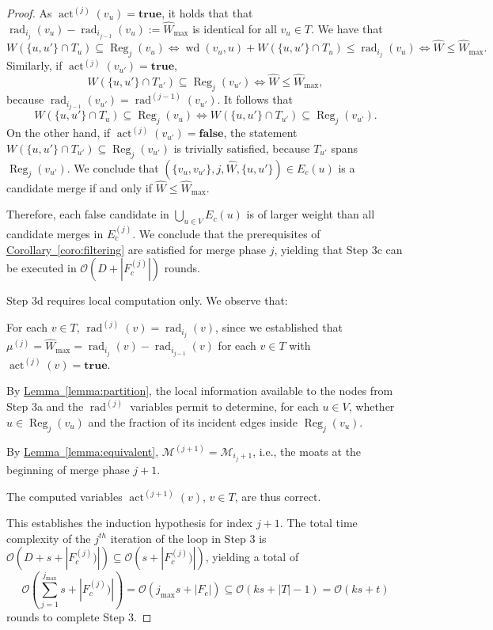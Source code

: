\documentclass[letterpaper,11pt]{article}
\newcommand{\namedref}[2]{\hyperref[#2]{#1~\ref*{#2}}}
\newcommand{\lemmaref}[1]{\namedref{Lemma}{#1}}
\newcommand{\corollaryref}[1]{\namedref{Corollary}{#1}}
\newcommand{\BO}{\mathcal{O}}
\newcommand{\M}{\mathcal{M}}
\DeclareMathOperator{\act}{act}
\DeclareMathOperator{\moat}{rad}
\DeclareMathOperator{\Wd}{wd}
\DeclareMathOperator{\reg}{Reg}
\newcommand{\true}{\mathbf{true}}
\newcommand{\false}{\mathbf{false}}
\begin{document}
\begin{proof}
As $\act^{(j)}(v_u)=\true$, it holds that that
$\moat_{i_j}(v_u)-\moat_{i_{j-1}}(v_u):=\hat{W}_{\max}$ is identical for all
$v_u\in T$. We have that
\begin{equation*}
W(\{u,u'\}\cap T_u)\subseteq \reg_j(v_u)\Leftrightarrow
\Wd(v_u,u)+W(\{u,u'\}\cap T_u)\leq \moat_{i_j}(v_u)
\Leftrightarrow \hat{W}\leq \hat{W}_{\max}.
\end{equation*}
Similarly, if $\act^{(j)}(v_{u'})=\true$,
\begin{equation*}
W(\{u,u'\}\cap T_{u'})\subseteq \reg_j(v_{u'})\Leftrightarrow
\hat{W}\leq \hat{W}_{\max},
\end{equation*}
because $\moat_{i_{j-1}}(v_{u'})=\moat^{(j-1)}(v_{u'})$. It follows that
\begin{equation*}
W(\{u,u'\}\cap T_u)\subseteq \reg_j(v_u)\Leftrightarrow
W(\{u,u'\}\cap T_{u'})\subseteq \reg_j(v_{u'}).
\end{equation*}
On the other hand, if $\act^{(j)}(v_{u'})=\false$, the statement $W(\{u,u'\}\cap
T_{u'})\subseteq \reg_j(v_{u'})$ is trivially satisfied, because $T_{u'}$ spans
$\reg_j(v_{u'})$. We conclude that $(\{v_u,v_{u'}\},j,\hat{W},\{u,u'\})\in
E_c(u)$ is a candidate merge if and only if $\hat{W}\leq \hat{W}_{\max}$.

Therefore, each false candidate in $\bigcup_{u\in V}E_c(u)$ is of larger weight
than all candidate merges in $E_c^{(j)}$. We conclude that the prerequisites of
\corollaryref{coro:filtering} are satisfied for merge phase $j$, yielding that
Step 3c can be executed in $\BO(D+|F_c^{(j)}|)$ rounds.

Step 3d requires local computation only. We observe that:
\begin{compactitem}
\item For each $v\in T$, $\moat^{(j)}(v)=\moat_{i_j}(v)$, since we established
that $\mu^{(j)}=\hat{W}_{\max}=\moat_{i_j}(v)-\moat_{i_{j-1}}(v)$ for each $v\in
T$ with $\act^{(j)}(v)=\true$.
\item By \lemmaref{lemma:partition}, the local information available to the
nodes from Step 3a and the $\moat^{(j)}$ variables permit to determine, for each
$u\in V$, whether $u\in \reg_j(v_u)$ and the fraction of its incident edges
inside $\reg_j(v_u)$.
\item By \lemmaref{lemma:equivalent}, $\M^{(j+1)}=\M_{i_j+1}$, i.e., the moats
at the beginning of merge phase $j+1$.
\item The computed variables $\act^{(j+1)}(v)$, $v\in T$, are thus correct.
\end{compactitem}
This establishes the induction hypothesis for index $j+1$. The total time
complexity of the $j^{th}$ iteration of the loop in Step 3 is
$\BO(D+s+|F_c^{(j)})|)\subseteq \BO(s+|F_c^{(j)})|)$, yielding a total of
\begin{equation*}
\BO\left(\sum_{j=1}^{j_{\max}}s+|F_c^{(j)})|\right)=
\BO\left(j_{\max}s+|F_c|\right)\subseteq \BO(ks+|T|-1)=\BO(ks+t)
\end{equation*}
rounds to complete Step 3.


\end{proof}
\end{document}
